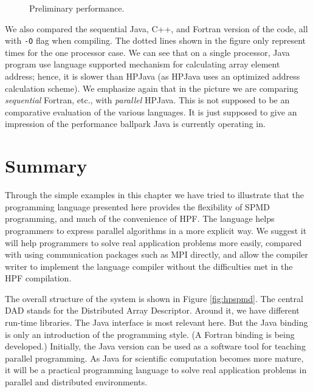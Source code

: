 \begin{figure}[tbp]
  \begin{center}
    \leavevmode
    \caption{Preliminary performance.}
    \label{fig:performance}
  \end{center}
\end{figure}

We also compared the sequential Java, C++, and Fortran version of the
code, all with \texttt{-O} flag when compiling. The dotted lines shown
in the figure only represent times for the one processor case. We can
see that on a single processor, Java program use language supported
mechanism for calculating array element address; hence, it is slower than
HPJava (as HPJava uses an optimized address calculation scheme). We emphasize again that in the
picture we are comparing {\em sequential} Fortran, etc., with {\em
parallel} HPJava.  This is not supposed to be an comparative evaluation
of the various languages.  It is just supposed to give an impression of
the performance ballpark Java is currently operating in.

\section{Summary\label{summary.tex}}

Through the simple examples in this chapter we have tried to
illustrate that the programming language presented here provides the
flexibility of SPMD programming, and much of the convenience of HPF.
The language helps programmers to express parallel algorithms in a
more explicit way.  We suggest it will help programmers to solve real
application problems more easily, compared with using communication
packages such as MPI directly, and allow the compiler writer to
implement the language compiler without the difficulties met in the HPF
compilation.

The overall structure of the system is shown in Figure
\ref{fig:hpspmd}.  The central DAD stands for the Distributed Array
Descriptor.  Around it, we have different run-time libraries. The Java
interface is most relevant here.  But the Java binding is only an
introduction of the programming style.  (A Fortran binding is being
developed.)  Initially, the Java version can be used as a software tool
for teaching parallel programming.  As Java for scientific computation
becomes more mature, it will be a practical programming language to
solve real application problems in parallel and distributed
environments.

